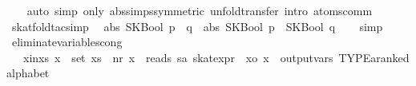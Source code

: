 \begin{isabellebody}
\ \ \isamarkupfalse%
\ {}auto\ simp\ only{}\ abs{}simps{}symmetric{}\ unfold{}transfer\ intro{}\ atoms{}comm{}%
\endisatagproof
{\isafoldproof}%
%
\isadelimproof
\isanewline
%
\endisadelimproof
\isanewline
{}\isamarkupfalse%
\ skat{}fold{}tac{}simp{}\isanewline
\ \ {}abs\ {}SKBool\ {}p\ {}{}{}\ q{}{}\ {}\ abs\ {}SKBool\ p\ {}\ SKBool\ q{}{}\isanewline
%
\isadelimproof
\ \ %
\endisadelimproof
%
\isatagproof
{}\isamarkupfalse%
\ simp%
\endisatagproof
{\isafoldproof}%
%
\isadelimproof
\isanewline
%
\endisadelimproof
\isanewline
{}\isamarkupfalse%
\ eliminate{}variables{}cong{}\isanewline
\ \ \ x{}in{}xs{}\ {}x\ {}\ set\ xs{}\ \ nr{}\ {}x\ {}\ reads\ {}s{}{}{}a\ skat{}expr{}{}\ \ xo{}\ {}x\ {}\ output{}vars\ TYPE{}{}a{}{}ranked{}alphabet{}{}\isanewline

\end{isabellebody}
